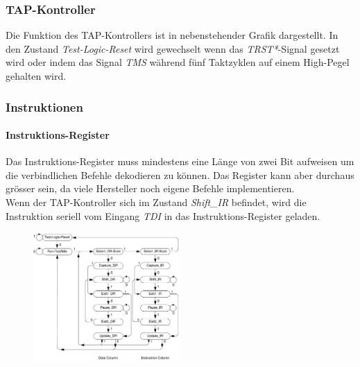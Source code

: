 \begin{multicols}{2}
    \subsubsection{TAP-Kontroller}
    Die Funktion des TAP-Kontrollers ist in nebenstehender Grafik dargestellt. In den Zustand \textit{Test-Logic-Reset} wird gewechselt wenn das \textit{TRST*}-Signal gesetzt wird oder indem das Signal \textit{TMS} während fünf Taktzyklen auf einem High-Pegel gehalten wird.

    \subsubsection{Instruktionen}
    \paragraph{Instruktions-Register}
    Das Instruktions-Register muss mindestens eine Länge von zwei Bit aufweisen um die verbindlichen Befehle dekodieren zu können. Das Register kann aber durchaus grösser sein, da viele Hersteller noch eigene Befehle implementieren. \\
    Wenn der TAP-Kontroller sich im Zustand \textit{Shift\_IR} befindet, wird die Instruktion seriell vom Eingang \textit{TDI} in das Instruktions-Register geladen.

    \begin{figure}[H]
        \includegraphics[width=0.5\textwidth]{images/bst_tapkontroller.png}
    \end{figure}
\end{multicols}

